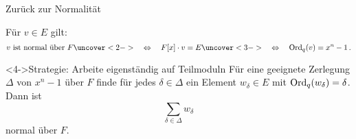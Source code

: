 \documentclass{vorlage}
\begin{document}
\begin{frame}{Zurück zur Normalität}
  \begin{lemma}
    Für $v \in E$ gilt:
    \[ v \text{ ist normal über $F$} 
      \uncover<2->{\quad\Leftrightarrow\quad F[x]\cdot v = E}
      \uncover<3->{\quad\Leftrightarrow\quad
      \Ord_q(v) = x^n-1\,.}\]
  \end{lemma}
  \begin{block}<4->{Strategie: Arbeite eigenständig auf Teilmoduln}
    Für eine geeignete Zerlegung $\Delta$ von $x^n-1$ über $F$ finde  
    für jedes $\delta\in \Delta$ ein Element
    $w_\delta\in E$ mit $\operatorname{Ord}_q(w_\delta) = \delta$.
    Dann ist
      \[ \sum_{\delta\in\Delta} w_\delta\]
    normal über $F$.

  \end{block}
\end{frame}
\end{document}
